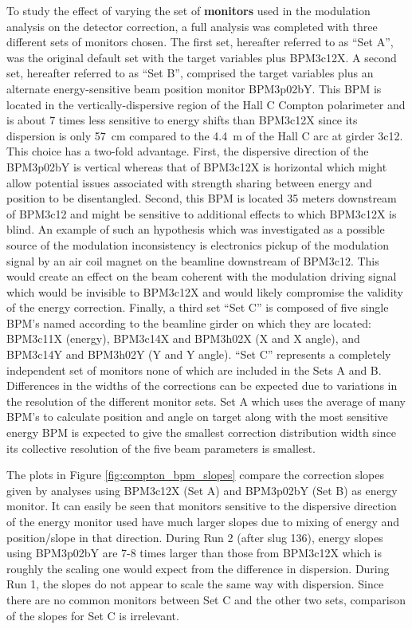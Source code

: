 To study the effect of varying the set of {\bf monitors} used in the modulation analysis on the detector correction, a full analysis was completed with three different sets of monitors chosen. The first set, hereafter referred to as ``Set A'', was the original default set with the target variables plus BPM3c12X. A second set, hereafter referred to as ``Set B'', comprised the target variables plus an alternate energy-sensitive beam position monitor BPM3p02bY. This BPM is located in the vertically-dispersive region of the Hall C Compton polarimeter and is about 7 times less sensitive to energy shifts than BPM3c12X since its dispersion is only 57~cm compared to the 4.4~m of the Hall C arc at girder 3c12. This choice has a two-fold advantage. First, the dispersive direction of the BPM3p02bY is vertical whereas that of  BPM3c12X is horizontal which might allow potential issues associated with strength sharing between energy and position to be disentangled. Second, this BPM is located 35 meters downstream of BPM3c12 and might be sensitive to additional effects to which BPM3c12X is blind. An example of such an hypothesis which was investigated as a possible source of the modulation inconsistency is electronics pickup of the modulation signal by an air coil magnet on the beamline downstream of BPM3c12. This would create an effect on the beam coherent with the modulation driving signal which would be invisible to BPM3c12X and would likely compromise the validity of the energy correction. Finally, a third set ``Set C'' is composed of five single BPM's named according to the beamline girder on which they are located: BPM3c11X (energy),  BPM3c14X and BPM3h02X (X and X angle), and BPM3c14Y and BPM3h02Y (Y and Y angle). ``Set C'' represents a completely independent set of monitors none of which are included in the Sets A and B. Differences in the widths of the corrections can be expected due to variations in the resolution of the different monitor sets. Set A which uses the average of many BPM's to calculate position and angle on target along with the most sensitive energy BPM is expected to give the smallest correction distribution width since its collective resolution of the five beam parameters is smallest. 

The plots in Figure \ref{fig:compton_bpm_slopes} compare the correction slopes given by analyses using BPM3c12X (Set A) and BPM3p02bY (Set B) as energy monitor. It can easily be seen that monitors sensitive to the dispersive direction of the energy monitor used have much larger slopes due to mixing of energy and position/slope in that direction. During Run 2 (after slug 136), energy slopes using BPM3p02bY are 7-8 times larger than those from BPM3c12X which is roughly the scaling one would expect from the difference in dispersion. During Run 1, the slopes do not appear to scale the same way with dispersion. Since there are no common monitors between Set C and the other two sets, comparison of the slopes for Set C is irrelevant.

